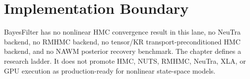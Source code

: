 \section{Implementation Boundary}
\label{sec:bf-hd-hmc-boundary}

BayesFilter has no nonlinear HMC convergence result in this lane, no NeuTra
backend, no RMHMC backend, no tensor/KR transport-preconditioned HMC backend,
and no NAWM posterior recovery benchmark.  The chapter defines a research
ladder.  It does not promote HMC, NUTS, RMHMC, NeuTra, XLA, or GPU execution as
production-ready for nonlinear state-space models.
